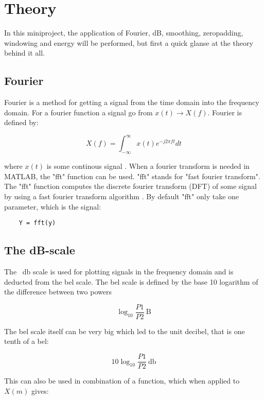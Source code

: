 \section{Theory}
\label{sec:theory}
In this miniproject, the application of Fourier, dB, smoothing, zeropadding, windowing and energy will be performed, but first a quick glanse at the theory behind it all.

\subsection{Fourier}

Fourier is a method for getting a signal from the time domain into the frequency domain. 
For a fourier function a signal go from $x(t) \rightarrow X(f)$. Fourier is defined by:

\begin{equation}
X(f) = \int_{-\infty}^{\infty} x(t)e^{-j2\pi ft}dt
\end{equation}

where $x(t)$ is some continous signal \cite[p. 53]{DSP}. 
When a fourier transform is needed in MATLAB, the "fft" function can be used. 
"fft" stands for "fast fourier transform". 
The "fft" function computes the discrete fourier transform (DFT) of some signal by using a fast fourier transform algorithm \cite[fft]{MATLAB_DOC}. 
By default "fft" only take one parameter, which is the signal:

\begin{verbatim}
	Y = fft(y)
\end{verbatim}

\subsection{The dB-scale}

The \SI{}{\decibel} scale is used for plotting signals in the frequency domain and is deducted from the bel scale. 
The bel scale is defined by the base 10 logarithm of the difference between two powers\cite[Appendix E]{DSP}

\[
\log_{10}\frac{P1}{P2}\SI{}{\bel}
\] 

The bel scale itself can be very big which led to the unit decibel, that is one tenth of a bel:

\begin{equation}
10\log_{10}\frac{P1}{P2}\SI{}{\decibel}
\end{equation}

This can also be used in combination of a function, which when applied to $X(m)$ gives:

